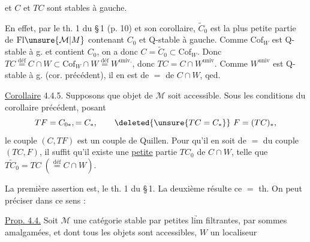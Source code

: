 
 et $C$ et $TC$ sont stables à gauche.

En effet, par le th. 1 du \S\,1 (p. 10) et
son corollaire, $\widetilde C_0$ est la plus petite partie
de $\mathrm{Fl}\unsure{\mathcal M|M}$ contenant $C_0$ et Q-stable à gauche.
Comme $\mathrm{Cof}_W$ \deleted{$\unsure{\subset}$} est Q-stable à g. et contient
$C_0$, on a donc $C=\widetilde C_0\subset\mathrm{Cof}_W$. Donc
$TC\overset{\mathrm{déf}}{=}C\cap W\subset\mathrm{Cof}_W\cap W\overset{\mathrm{déf}}{=}W^{\mathrm{univ.}}$,
 donc $TC=C\cap W^{\mathrm{univ}}$. Comme
$W^{\mathrm{univ}}$ est  Q-stable à g. (cor. précédent), il
en est de $=$ de $C\cap W$, qed.

\uline{Corollaire} 4.4.5. Supposons que  objet de
$\mathcal M$ soit accessible. Sous les conditions du
corollaire précédent,  posant
\[
 TF=C_{0*},=C_*,\qquad \deleted{\unsure{TC=C_*}}\ F=(TC)_*,
\]
le couple $(C,TF)$ est un couple de
Quillen. Pour qu'il en soit de $=$
du couple $(TC,F)$, il suffit qu'il
existe une \uline{petite} partie $TC_0$ de $C\cap W$,
telle que $\widetilde{TC_0}=TC\;(\overset{\mathrm{déf}}{=}C\cap W)$.

La première assertion est,  le th. 1 du
\S\,1.  La deuxième résulte  ce $=$
th. On peut préciser dans ce sens :

\uline{Prop. 4.4.} Soit $\mathcal M$ une catégorie stable par petites
$\underrightarrow{\mathrm{lim}}$ filtrantes, par sommes amalgamées, et dont
tous les objets sont accessibles, $W$ un localiseur

